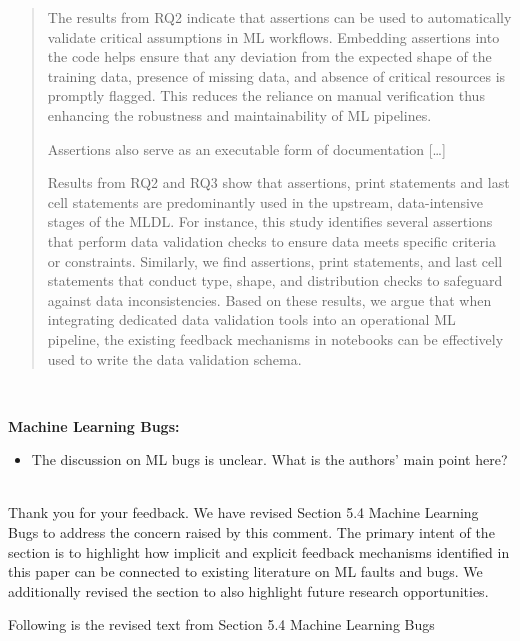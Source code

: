 \documentclass[11pt,fleqn]{article}
\newcommand{\eline}{\vspace*{.75\baselineskip}}
\newcommand{\Referee}[1]{\eline \noindent {\bf Reviewer comment #1:} \\}
\newcommand{\Us}{\eline \noindent {\bf Response:}\\}
\newenvironment{revcomment}[1][]
{\Referee{#1}\begin{rcomment}}
{\end{rcomment}}
\begin{document}
\begin{quote}
  The results from RQ2 indicate that assertions can be used to automatically validate critical assumptions in ML workflows. Embedding assertions into the code helps ensure that any deviation from the expected shape of the training data, presence of missing data, and absence of critical resources is promptly flagged. This reduces the reliance on manual verification thus enhancing the robustness and maintainability of ML pipelines.

  Assertions also serve as an executable form of documentation [\ldots]

  Results from RQ2 and RQ3 show that assertions, print statements and last cell statements are predominantly used in the upstream, data-intensive stages of the MLDL. For instance, this study identifies several assertions that perform data validation checks to ensure data meets specific criteria or constraints. Similarly, we find assertions, print statements, and last cell statements that conduct type, shape, and distribution checks to safeguard against data inconsistencies. Based on these results, we argue that when integrating dedicated data validation tools into an operational ML pipeline, the existing feedback mechanisms in notebooks can be effectively used to write the data validation schema.
\end{quote}

\begin{revcomment}[3.13]
  \textbf{Machine Learning Bugs:}

  \begin{itemize}
    \item The discussion on ML bugs is unclear. What is the authors' main point here?
  \end{itemize}
\end{revcomment}

\Us Thank you for your feedback. We have revised Section 5.4 Machine Learning Bugs to address the concern raised by this comment. The primary intent of the section is to highlight how implicit and explicit feedback mechanisms identified in this paper can be connected to existing literature on ML faults and bugs. We additionally revised the section to also highlight future research opportunities.

Following is the revised text from Section 5.4 Machine Learning Bugs
\end{document}
